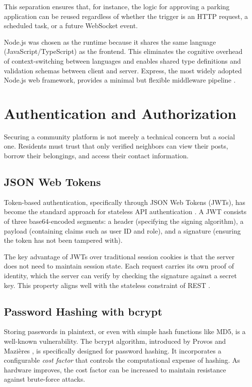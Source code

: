 This separation ensures that, for instance, the logic for approving a parking application can be reused regardless of whether the trigger is an HTTP request, a scheduled task, or a future WebSocket event.

Node.js was chosen as the runtime because it shares the same language (JavaScript/TypeScript) as the frontend. This eliminates the cognitive overhead of context-switching between languages and enables shared type definitions and validation schemas between client and server. Express, the most widely adopted Node.js web framework, provides a minimal but flexible middleware pipeline \cite{expressDocs}.

\section{Authentication and Authorization}

Securing a community platform is not merely a technical concern but a social one. Residents must trust that only verified neighbors can view their posts, borrow their belongings, and access their contact information.

\subsection{JSON Web Tokens}

Token-based authentication, specifically through JSON Web Tokens (JWTs), has become the standard approach for stateless API authentication \cite{jones2015jwt}. A JWT consists of three base64-encoded segments: a header (specifying the signing algorithm), a payload (containing claims such as user ID and role), and a signature (ensuring the token has not been tampered with).

The key advantage of JWTs over traditional session cookies is that the server does not need to maintain session state. Each request carries its own proof of identity, which the server can verify by checking the signature against a secret key. This property aligns well with the stateless constraint of REST \cite{fielding2000rest}.

\subsection{Password Hashing with bcrypt}

Storing passwords in plaintext, or even with simple hash functions like MD5, is a well-known vulnerability. The bcrypt algorithm, introduced by Provos and Mazi\`{e}res \cite{provos1999bcrypt}, is specifically designed for password hashing. It incorporates a configurable \textit{cost factor} that controls the computational expense of hashing. As hardware improves, the cost factor can be increased to maintain resistance against brute-force attacks.

